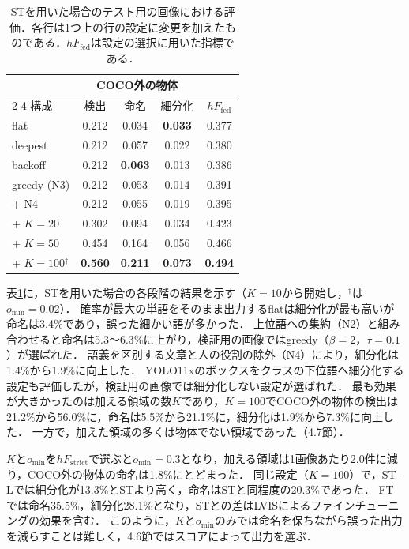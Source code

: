 \begin{table}[t]
    \vspace{3mm}
    \centering
    \caption{STを用いた場合のテスト用の画像における評価．各行は1つ上の行の設定に変更を加えたものである．$ hF_{\mathrm{fed}} $は設定の選択に用いた指標である．}
    \label{tab_open}
    \footnotesize
    \setlength{\tabcolsep}{2pt}
    \begin{tabular}{lcccc}
        \toprule
        & \multicolumn{3}{c}{COCO外の物体} & \\
        \cmidrule(lr){2-4}
        構成 & 検出 & 命名 & 細分化 & $ hF_{\mathrm{fed}} $ \\
        \midrule
        flat & 0.212 & 0.034 & {\bf 0.033} & 0.377 \\
        deepest & 0.212 & 0.057 & 0.022 & 0.380 \\
        backoff & 0.212 & {\bf 0.063} & 0.013 & 0.386 \\
        greedy (N3) & 0.212 & 0.053 & 0.014 & 0.391 \\
        + N4 & 0.212 & 0.055 & 0.019 & 0.395 \\
        \midrule
        + $ K{=}20 $ & 0.302 & 0.094 & 0.034 & 0.423 \\
        + $ K{=}50 $ & 0.454 & 0.164 & 0.056 & 0.466 \\
        + $ K{=}100 $$ ^\dagger $ & {\bf 0.560} & {\bf 0.211} & {\bf 0.073} & {\bf 0.494} \\
        \bottomrule
    \end{tabular}
\end{table}

表\ref{tab_open}に，STを用いた場合の各段階の結果を示す（$ K = 10 $から開始し，$ ^\dagger $は$ o_{\min} = 0.02 $）．
確率が最大の単語をそのまま出力するflatは細分化が最も高いが命名は3.4\%であり，誤った細かい語が多かった．
上位語への集約（N2）と組み合わせると命名は5.3〜6.3\%に上がり，検証用の画像ではgreedy（$ \beta = 2 $，$ \tau = 0.1 $）が選ばれた．
語義を区別する文章と人の役割の除外（N4）により，細分化は1.4\%から1.9\%に向上した．
YOLO11xのボックスをクラスの下位語へ細分化する設定も評価したが，検証用の画像では細分化しない設定が選ばれた．
最も効果が大きかったのは加える領域の数$ K $であり，$ K = 100 $でCOCO外の物体の検出は21.2\%から56.0\%に，命名は5.5\%から21.1\%に，細分化は1.9\%から7.3\%に向上した．
一方で，加えた領域の多くは物体でない領域であった（4.7節）．

$ K $と$ o_{\min} $を$ hF_{\mathrm{strict}} $で選ぶと$ o_{\min} = 0.3 $となり，加える領域は1画像あたり2.0件に減り，COCO外の物体の命名は1.8\%にとどまった．
同じ設定（$ K = 100 $）で，ST-Lでは細分化が13.3\%とSTより高く，命名はSTと同程度の20.3\%であった．
FTでは命名35.5\%，細分化28.1\%となり，STとの差はLVISによるファインチューニングの効果を含む．
このように，$ K $と$ o_{\min} $のみでは命名を保ちながら誤った出力を減らすことは難しく，4.6節ではスコアによって出力を選ぶ．

